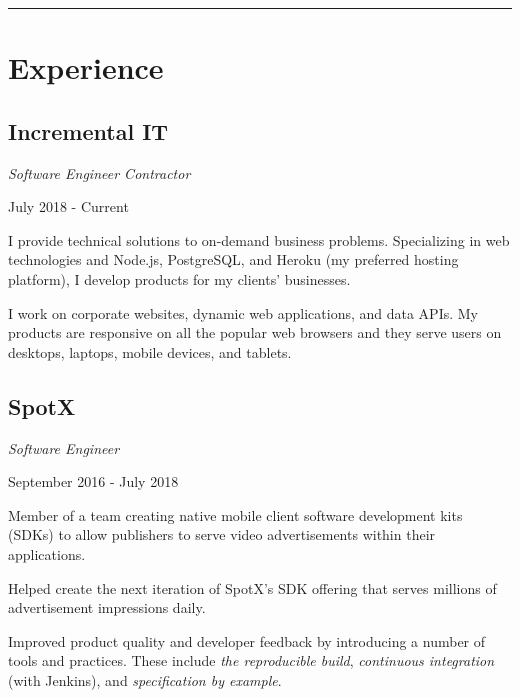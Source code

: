 \setlength{\parindent}{0cm}
\setlength{\parskip}{0.5em}

\hrule
\section*{Experience}

\subsection*{Incremental IT}
\noindent\begin{minipage}[b]{0.5\textwidth}
  \flushleft
  \emph{Software Engineer Contractor}
\end{minipage}
\noindent\begin{minipage}[b]{0.5\textwidth}
  \flushright
  July 2018 - Current
\end{minipage}

I provide technical solutions to on-demand business problems. Specializing in
web technologies and Node.js, PostgreSQL, and Heroku (my preferred hosting
platform), I develop products for my clients' businesses.

I work on corporate websites, dynamic web applications, and data APIs. My
products are responsive on all the popular web browsers and they serve users
on desktops, laptops, mobile devices, and tablets.

\subsection*{SpotX}
\noindent\begin{minipage}[b]{0.5\textwidth}
  \flushleft
  \emph{Software Engineer}
\end{minipage}
\noindent\begin{minipage}[b]{0.5\textwidth}
  \flushright
  September 2016 - July 2018
\end{minipage}

Member of a team creating native mobile client software development kits (SDKs)
to allow publishers to serve video advertisements within their applications.

Helped create the next iteration of SpotX's SDK offering that serves millions of
advertisement impressions daily.

Improved product quality and developer feedback by introducing a number of tools
and practices. These include \emph{the reproducible build}, \emph{continuous
  integration} (with Jenkins), and \emph{specification by example}.

